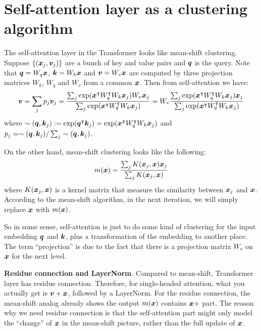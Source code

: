 \section{Self-attention layer as a clustering algorithm}
\label{sec:clustering understanding}
The self-attention layer in the Transformer looks like mean-shift clustering. Suppose $\{({\bm{x}}_j, {\bm{v}}_j)\}$ are a bunch of key and value pairs and ${\bm{q}}$ is the query. Note that ${\bm{q}}=W_q{\bm{x}}$, ${\bm{k}}=W_k {\bm{x}}$ and ${\bm{v}}=W_v {\bm{x}}$ are computed by three projection matrices $W_k$, $W_q$ and $W_v$ from a common ${\bm{x}}$. Then from self-attention we have:
\begin{equation}
    {\bm{v}} = \sum_j p_j {\bm{v}}_j = \frac{\sum_j \exp({\bm{x}}^\intercal W_q^\intercal W_k {\bm{x}}_j) W_v {\bm{x}}_j}{\sum_j \exp({\bm{x}}^\intercal W_q^\intercal W_k {\bm{x}}_j)} = W_v \frac{\sum_j \exp({\bm{x}}^\intercal W_q^\intercal W_k {\bm{x}}_j) {\bm{x}}_j}{\sum_j \exp({\bm{x}}^\intercal W_q^\intercal W_k {\bm{x}}_j)} 
\end{equation}
where $\sim({\bm{q}}, {\bm{k}}_j) := \exp({\bm{q}}^\intercal {\bm{k}}_j) = \exp({\bm{x}}^\intercal W_q^\intercal W_k{\bm{x}}_j)$ and $p_j = \sim({\bm{q}}, {\bm{k}}_j) / \sum_j \sim({\bm{q}}, {\bm{k}}_j)$. 

On the other hand, mean-shift clustering looks like the following:
\begin{equation}
    m({\bm{x}}) = \frac{\sum_j K({\bm{x}}_j,{\bm{x}}) {\bm{x}}_j}{\sum_j K({\bm{x}}_j,{\bm{x}})}
\end{equation}
where $K({\bm{x}}_j,{\bm{x}})$ is a kernel matrix that measure the similarity between ${\bm{x}}_j$ and ${\bm{x}}$. According to the mean-shift algorithm, in the next iteration, we will simply replace ${\bm{x}}$ with $m({\bm{x}})$.

So in some sense, self-attention is just to do some kind of clustering for the input embedding ${\bm{q}}$ and ${\bm{k}}$, plus a transformation of the embedding to another place. The term ``projection'' is due to the fact that there is a projection matrix $W_v$ on ${\bm{x}}$ for the next level.  


\textbf{Residue connection and LayerNorm}. Compared to mean-shift, Transformer layer has residue connection. Therefore, for single-headed attention, what you actually get is ${\bm{v}} + {\bm{x}}$, followed by a LayerNorm. 
For the residue connection, the mean-shift analog already shows the output $m({\bm{x}})$ contains ${\bm{x}}+$ part. The reason why we need residue connection is that the self-attention part might only model the ``change'' of ${\bm{x}}$ in the mean-shift picture, rather than the full update of ${\bm{x}}$.

